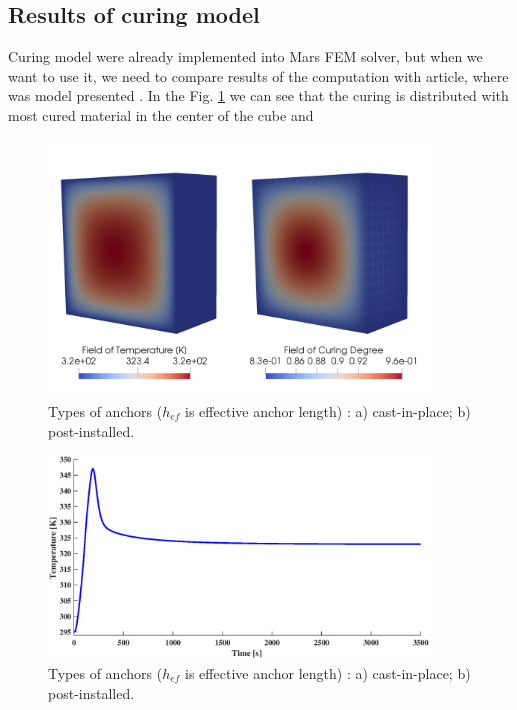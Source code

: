 \subsection{Results of curing model}
\indent

Curing model were already implemented into Mars FEM solver, but when we want to use it, we need to compare results of the computation with article, where was model presented \cite{heinrich2012generation}. In the Fig. \ref{obr:Curing_cube} we can see that the curing is distributed with most cured material in the center of the cube and 


\begin{figure}[h!]
	\centering
	\includegraphics[width=0.9\textwidth]{obrazky/curing__and_temperature.png}
	\caption[Types of anchors]{Types of anchors ($h_{ef}$ is effective anchor length) \cite{anchors-ACI-318M}: a) cast-in-place; b) post-installed.}\label{obr:Curing_cube}
\end{figure}



\begin{figure}[h!]
	\centering
	\includegraphics[width=0.9\textwidth]{obrazky/T-t.eps}
	\caption[Types of anchors]{Types of anchors ($h_{ef}$ is effective anchor length) \cite{anchors-ACI-318M}: a) cast-in-place; b) post-installed.}\label{obr:Curing_temperature}
\end{figure}

